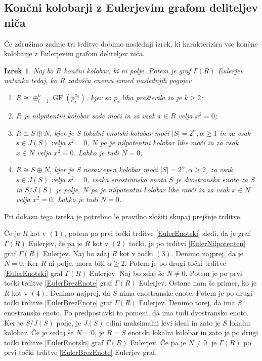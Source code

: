 \documentclass[a4paper, 12pt]{amsart}
\theoremstyle{definition} %
\theoremstyle{plain} %
\newtheorem{izrek}[definicija]{Izrek}
\DeclareMathOperator{\GF}{GF}
\begin{document}
\endproof


\subsection{Končni kolobarji z Eulerjevim grafom deliteljev niča}

Če združimo zadnje tri trditve dobimo naslednji izrek, ki karakterizira vse končne kolobarje z Eulerjevim grafom deliteljev niča.

\begin{izrek}
\label{EulerGraf}
Naj bo $R$ končni kolobar, ki ni polje. Potem je graf $\Gamma(R)$ Eulerjev natanko tedaj, ko $R$ zadošča enemu izmed naslednjih pogojev
\begin{enumerate}
\item $R \cong \oplus_{i=1}^k \GF(p_i^{\alpha_i})$, kjer so $p_i$ liha praštevila in je $k\ge 2$;
\item $R$ je nilpotentni kolobar sode moči in za vsak $x\in R$ velja $x^2 = 0$;
\item $R\cong S\oplus N$, kjer je $S$ lokalni enotski kolobar moči $|S| = 2^{\alpha}, \alpha \ge 1$ in za vsak $s\in J(S)$ velja $s^2 = 0$, $N$ pa je nilpotentni kolobar lihe moči in za vsak $x\in N$ velja $x^2 = 0$. Lahko je tudi $N=0$;
\item $R\cong S \oplus N$, kjer je $S$ nerazcepen kolobar moči $|S| = 2^{\alpha}, \alpha \ge 2$, za vsak $s\in J(S)$ velja $s^2 = 0$, vsaka enostranska enota $S$ je dvostranska enota za $S$ in $S/J(S)$ je polje, $N$ pa je nilpotentni kolobar lihe moči in za vsak $x\in N$ velja $x^2 = 0$. Lahko je tudi $N=0$.
\end{enumerate} 
\end{izrek}

\proof
Pri dokazu tega izreka je potrebno le pravilno zložiti skupaj prejšnje trditve. 

Če je $R$ kot v $(1)$, potem po prvi točki trditve \ref{EulerEnotski} sledi, da je graf $\Gamma(R)$ Eulerjev, če pa je $R$ kot v $(2)$ točki, je po trditvi \ref{EulerNilpotenten} graf $\Gamma(R)$ Eulerjev. Naj bo zdaj $R$ kot v točki $(3)$. Denimo najprej, da je $N=0$. Ker $R$ ni polje, mora biti $\alpha \ge 2$. Potem je po drugi točki trditve \ref{EulerEnotski} graf $\Gamma(R)$ Eulerjev. Naj bo zdaj še $N\neq 0$. Potem je po prvi točki trditve \ref{EulerBrezEnote} graf $\Gamma(R)$ Eulerjev. Ostane nam še primer, ko je $R$ kot v $(4)$. Denimo najprej, da $S$ nima enostranske enote. Potem je po drugi točki trditve \ref{EulerBrezEnote} graf $\Gamma(R)$ Eulerjev. Denimo torej, da ima $S$ enostransko enoto. Po predpostavki to pomeni, da ima tudi dvostransko enoto. Ker je $S/J(S)$ polje, je $J(S)$ edini maksimalni levi ideal in zato je $S$ lokalni kolobar. Če je sedaj še $N=0$, je $R=S$ enotski lokalni kolobar in zato je po drugi točki trditve \ref{EulerEnotski} graf $\Gamma(R)$ Eulerjev. Če pa je $N\neq 0$, je $\Gamma(R)$ po prvi točki trditve \ref{EulerBrezEnote} Eulerjev graf.
\end{document}
